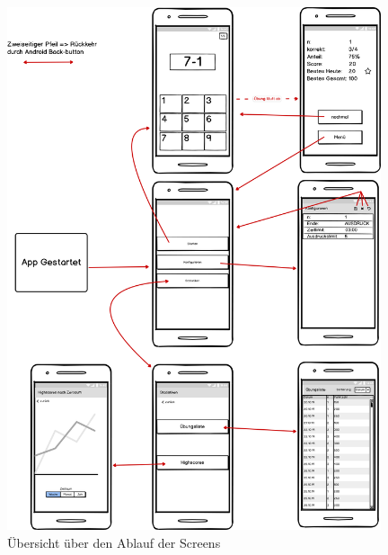 \begin{figure}[htbp]
\centering
\includegraphics[width=0.98\textwidth]{img/Ablauf}
\caption{Übersicht über den Ablauf der Screens}
\end{figure}

\newpage
